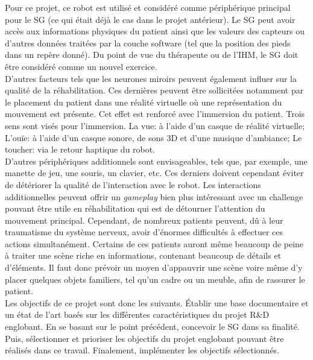Pour ce projet, ce robot est utilisé et considéré comme périphérique principal pour le SG (ce qui était déjà le cas dans le projet antérieur). Le SG peut avoir accès aux informations physiques du patient ainsi que les valeurs des capteurs ou d'autres données traitées par la couche software (tel que la position des pieds dans un repère donné). Du point de vue du thérapeute ou de l'IHM, le SG doit être considéré comme un nouvel exercice.
\\

D'autres facteurs tels que les neurones miroirs peuvent également influer sur la qualité de la réhabilitation. Ces dernières peuvent être sollicitées notamment par le placement du patient dans une réalité virtuelle où une représentation du mouvement est présente. Cet effet est renforcé avec l'immersion du patient. Trois sens sont visés pour l'immersion. La vue: à l'aide d'un casque de réalité virtuelle; L'ouïe: à l'aide d'un casque sonore, de sons 3D et d'une musique d'ambiance; Le toucher: via le retour haptique du robot.
\\

D'autres périphériques additionnels sont envisageables, tels que, par exemple, une manette de jeu, une souris, un clavier, etc. Ces derniers doivent cependant éviter de détériorer la qualité de l'interaction avec le robot. Les interactions additionnelles peuvent offrir un \textit{gameplay} bien plus intéressant avec un challenge pouvant être utile en réhabilitation qui est de détourner l'attention du mouvement principal. Cependant, de nombreux patients peuvent, dû à leur traumatisme du système nerveux, avoir d'énormes difficultés à effectuer ces actions simultanément. Certains de ces patients auront même beaucoup de peine à traiter une scène riche en informations, contenant beaucoup de détails et d'éléments. Il faut donc prévoir un moyen d'appauvrir une scène voire même d'y placer quelques objets familiers, tel qu'un cadre ou un meuble, afin de rassurer le patient.
\\

Les objectifs de ce projet sont donc les suivants. Établir une base documentaire et un état de l'art basés sur les différentes caractéristiques du projet R\&D englobant. En se basant sur le point précédent, concevoir le SG dans sa finalité. Puis, sélectionner et prioriser les objectifs du projet englobant pouvant être réalisés dans ce travail. Finalement, implémenter les objectifs sélectionnés.
\\

